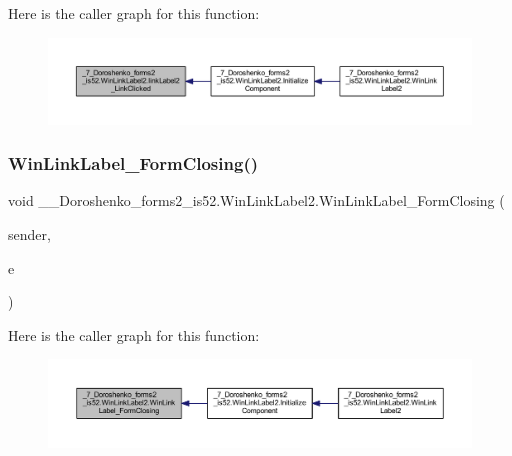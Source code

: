 Here is the caller graph for this function\+:
\nopagebreak
\begin{figure}[H]
\begin{center}
\leavevmode
\includegraphics[width=350pt]{class__7___doroshenko__forms2__is52_1_1_win_link_label2_a678645f20d76113ee4986b67e8263edc_icgraph}
\end{center}
\end{figure}
\hypertarget{class__7___doroshenko__forms2__is52_1_1_win_link_label2_a5d176ff501e5fef679b23b311b91a643}{}\label{class__7___doroshenko__forms2__is52_1_1_win_link_label2_a5d176ff501e5fef679b23b311b91a643} 
\subsubsection{\texorpdfstring{Win\+Link\+Label\+\_\+\+Form\+Closing()}{WinLinkLabel\_FormClosing()}}
{\footnotesize\ttfamily void \+\_\+\_\+\+Doroshenko\+\_\+forms2\+\_\+is52.\+Win\+Link\+Label2.\+Win\+Link\+Label\+\_\+\+Form\+Closing (\begin{DoxyParamCaption}\item[{object}]{sender,  }\item[{Form\+Closing\+Event\+Args}]{e }\end{DoxyParamCaption})\hspace{0.3cm}{\ttfamily [private]}}

Here is the caller graph for this function\+:
\nopagebreak
\begin{figure}[H]
\begin{center}
\leavevmode
\includegraphics[width=350pt]{class__7___doroshenko__forms2__is52_1_1_win_link_label2_a5d176ff501e5fef679b23b311b91a643_icgraph}
\end{center}
\end{figure}


